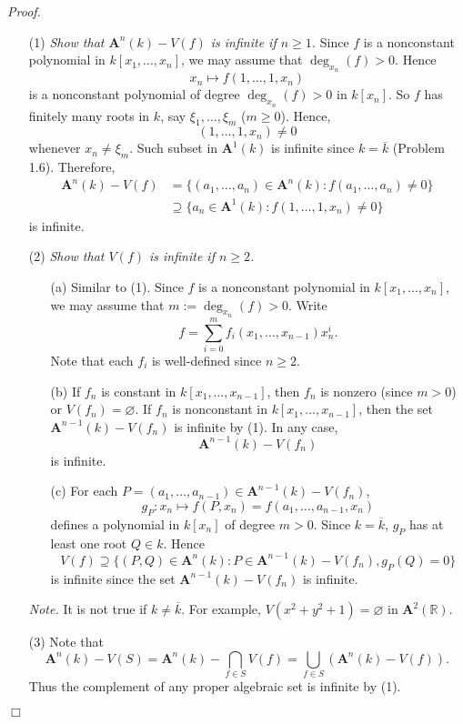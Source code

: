\documentclass{article}
\begin{document}
\emph{Proof.}
\begin{enumerate}
\item[(1)]
  \emph{Show that $\mathbf{A}^{n}(k) - V(f)$ is infinite if $n \geq 1$.}
  Since $f$ is a nonconstant polynomial in $k[x_1, \ldots, x_n]$,
  we may assume that $\deg_{x_n}(f) > 0$.
  Hence
  \[
    x_n \mapsto f(1,\ldots,1,x_n)
  \]
  is a nonconstant polynomial of degree $\deg_{x_n}(f) > 0$ in $k[x_n]$.
  So $f$ has finitely many roots in $k$, say $\xi_1, \ldots, \xi_m$ ($m \geq 0$).
  Hence,
  \[
    (1,\ldots,1,x_n) \neq 0
  \]
  whenever $x_n \neq \xi_m$.
  Such subset in $\mathbf{A}^{1}(k)$ is infinite since $k = \overline{k}$ (Problem 1.6).
  Therefore,
  \begin{align*}
    \mathbf{A}^{n}(k) - V(f)
    &=
    \{ (a_1,\ldots,a_n) \in \mathbf{A}^{n}(k) : f(a_1,\ldots,a_n) \neq 0 \} \\
    &\supseteq
    \{ a_n  \in \mathbf{A}^{1}(k) : f(1,\ldots,1,x_n) \neq 0 \}
  \end{align*}
  is infinite.

\item[(2)]
  \emph{Show that $V(f)$ is infinite if $n \geq 2$.}
  \begin{enumerate}
  \item[(a)]
    Similar to (1).
    Since $f$ is a nonconstant polynomial in $k[x_1, \ldots, x_n]$,
    we may assume that $m := \deg_{x_n}(f) > 0$.
    Write
    \[
      f = \sum_{i=0}^{m} f_i(x_1,\ldots,x_{n-1}) x_n^{i}.
    \]
    Note that each $f_i$ is well-defined since $n \geq 2$.

  \item[(b)]
    If $f_n$ is constant in $k[x_1, \ldots, x_{n-1}]$,
    then $f_n$ is nonzero (since $m > 0$) or $V(f_n) = \varnothing$.
    If $f_n$ is nonconstant in $k[x_1, \ldots, x_{n-1}]$,
    then the set $\mathbf{A}^{n-1}(k) - V(f_n)$ is infinite by (1).
    In any case,
    \[
      \mathbf{A}^{n-1}(k) - V(f_n)
    \]
    is infinite.

  \item[(c)]
    For each $P = (a_1,\ldots,a_{n-1}) \in \mathbf{A}^{n-1}(k) - V(f_n)$,
    \[
      g_P: x_n \mapsto f(P,x_n) = f(a_1,\ldots,a_{n-1},x_n)
    \]
    defines a polynomial in $k[x_n]$ of degree $m > 0$.
    Since $k = \overline{k}$, $g_P$ has at least one root $Q \in k$.
    Hence
    \[
      V(f) \supseteq
      \{ (P,Q) \in \mathbf{A}^{n}(k) : P \in \mathbf{A}^{n-1}(k) - V(f_n), g_P(Q) = 0 \}
    \]
    is infinite since the set $\mathbf{A}^{n-1}(k) - V(f_n)$ is infinite.
  \end{enumerate}
  \emph{Note.}
  It is not true if $k \neq \overline{k}$.
  For example, $V(x^2+y^2+1) = \varnothing$ in $\mathbf{A}^{2}(\mathbb{R})$.

\item[(3)]
  Note that
  \[
    \mathbf{A}^{n}(k) - V(S)
    = \mathbf{A}^{n}(k) - \bigcap_{f \in S} V(f)
    = \bigcup_{f \in S}( \mathbf{A}^{n}(k) - V(f) ).
  \]
  Thus the complement of any proper algebraic set is infinite by (1).
\end{enumerate}
$\Box$ \\\\
\end{document}
